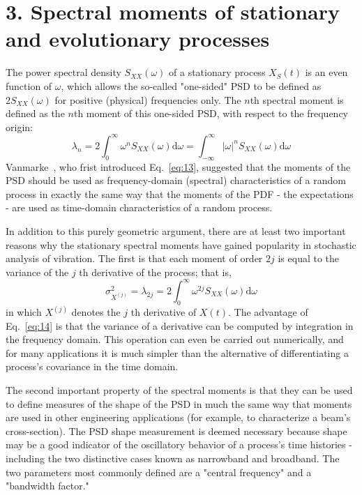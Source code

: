 \documentclass{article}
\begin{document}
\section*{3. Spectral moments of stationary and evolutionary processes}

The power spectral density $S_{XX} (\omega)$ of a stationary process $X_S (t)$
is an even function of $\omega$, which allows the so-called "one-sided" PSD to
be defined as $2 S_{XX} (\omega)$ for positive (physical) frequencies only.
The $n$th spectral moment is defined as the $n$th moment of this one-sided
PSD, with respect to the frequency origin:
\begin{equation}
  \lambda_n = 2 \int_0^{\infty} \omega^n S_{XX} (\omega) \mathrm{d} \omega =
  \int_{- \infty}^{\infty} | \omega |^n S_{XX} (\omega) \mathrm{d} \omega
  \label{eq:13}
\end{equation}
Vanmarke~{\cite{Vanmarke1972}}, who frist introduced Eq.~\eqref{eq:13},
suggested that the moments of the PSD should be used as frequency-domain
(spectral) characteristics of a random process in exactly the same way that
the moments of the PDF - the expectations - are used as time-domain
characteristics of a random process.

In addition to this purely geometric argument, there are at least two
important reasons why the stationary spectral moments have gained popularity
in stochastic analysis of vibration. The first is that each moment of order $2
j$ is equal to the variance of the $j$ th derivative of the process; that is,
\begin{equation}
  \sigma_{X^{(j)}}^2 = \lambda_{2 j} = 2 \int_0^{\infty} \omega^{2 j} S_{XX}
  (\omega) \mathrm{d} \omega \label{eq:14}
\end{equation}
in which $X^{(j)}$ denotes the $j$ th derivative of $X (t)$. The advantage of
Eq.~\eqref{eq:14} is that the variance of a derivative can be computed by
integration in the frequency domain. This operation can even be carried out
numerically, and for many applications it is much simpler than the alternative
of differentiating a process's covariance in the time domain.

The second important property of the spectral moments is that they can be used
to define measures of the shape of the PSD in much the same way that moments
are used in other engineering applications (for example, to characterize a
beam's cross-section). The PSD shape measurement is deemed necessary because
shape may be a good indicator of the oscillatory behavior of a process's time
histories - including the two distinctive cases known as narrowband and
broadband. The two parameters most commonly defined are a "central frequency"
and a "bandwidth factor."
\end{document}
